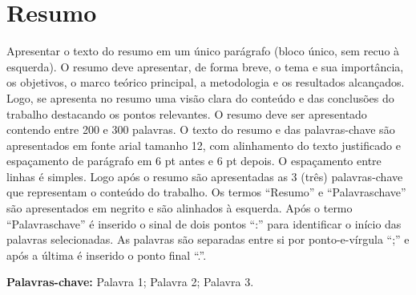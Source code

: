 \section*{Resumo}

\noindent
Apresentar o texto do resumo em um único parágrafo (bloco único, sem recuo à esquerda). O resumo deve apresentar, de forma breve, o tema e sua importância, os objetivos, o marco teórico principal, a metodologia e os resultados alcançados. Logo, se apresenta no resumo uma visão clara do conteúdo e das conclusões do trabalho destacando os pontos relevantes. O resumo deve ser apresentado contendo entre 200 e 300 palavras. O texto do resumo e das palavras-chave são apresentados em fonte arial tamanho 12, com alinhamento do texto justificado e espaçamento de parágrafo em 6 pt antes e 6 pt depois. O espaçamento entre linhas é simples. Logo após o resumo são apresentadas as 3 (três) palavras-chave que representam o conteúdo do trabalho. Os termos “Resumo” e “Palavraschave” são apresentados em negrito e são alinhados à esquerda. Após o termo “Palavraschave” é inserido o sinal de dois pontos “:” para identificar o início das palavras selecionadas. As palavras são separadas entre si por ponto-e-vírgula “;” e após a última é inserido o ponto final “.”.

\noindent\textbf{Palavras-chave:}
Palavra 1; Palavra 2; Palavra 3.
